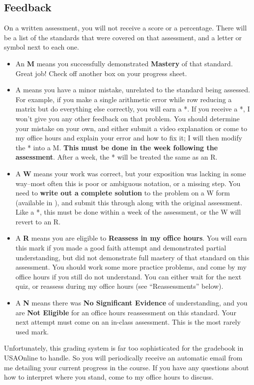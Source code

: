 \documentclass{article}
\begin{document}
    \subsection*{\fontsize{10}{12}\selectfont Feedback}
    On a written assessment, you will not receive a score or a percentage.  There will be a list of the standards that were covered on that assessment, and a letter or symbol next to each one.
    \begin{itemize}
    \item An {\bf M} means you successfully demonstrated {\bf Mastery} of that standard.  Great job!  Check off another box on your progress sheet.
    \item A {\bf *} means you have a minor mistake, unrelated to the standard being assessed.  For example, if you make a single arithmetic error while row reducing a matrix but do everything else correctly, you will earn a *.  If you receive a *, I won't give you any other feedback on that problem.  You should determine your mistake on your own, and either submit a video explanation or come to my office hours and explain your error and how to fix it; I will then modify the * into a M.  {\bf This must be done in the week following the assessment}.  After a week, the * will be treated the same as an R.
        \item A {\bf W} means your work was correct, but your exposition was lacking in some way--most often this is poor or ambiguous notation, or a missing step.  You need to {\bf write out a complete solution} to the problem on a W form (available in \LMS), and submit this through \LMS along with the original assessment.  Like a *, this must be done within a week of the assessment, or the W will revert to an R.
    \item A {\bf R} means you are eligible to {\bf Reassess in my office hours}.  You will earn this mark if you made a good faith attempt and demonstrated partial understanding, but did not demonstrate full mastery of that standard on this assessment.  You should work some more practice problems, and come by my office hours if you still do not understand.  You can either wait for the next quiz, or reassess during my office hours (see ``Reassessments'' below).

    \item A {\bf N} means there was {\bf No Significant Evidence} of understanding, and you are {\bf Not Eligible} for an office hours reassessment on this standard.  Your next attempt must come on an in-class assessment.  This is the most rarely used mark.

    \end{itemize}
    Unfortunately, this grading system is far too sophisticated for the gradebook in USAOnline to handle.  So you will periodically receive an automatic email from me detailing your current progress in the course.  If you have any questions about how to interpret where you stand, come to my office hours to discuss.
\end{document}
